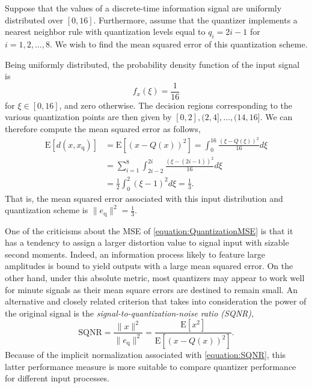 \begin{example} \label{example:UniformQuantizer}
Suppose that the values of a discrete-time information signal are uniformly distributed over $[0,16]$.
Furthermore, assume that the quantizer implements a nearest neighbor rule with quantization levels equal to $q_i = 2i - 1$ for $i = 1, 2, \ldots, 8$.
We wish to find the mean squared error of this quantization scheme.

Being uniformly distributed, the probability density function of the input signal is
\begin{equation*}
f_x (\xi) = \frac{1}{16}
\end{equation*}
for $\xi \in [0, 16]$, and zero otherwise.
The decision regions corresponding to the various quantization points are then given by $[0, 2], (2, 4], \ldots, (14, 16]$.
We can therefore compute the mean squared error as follows,
\begin{equation*}
\begin{split}
\mathrm{E} [ d(x, x_{\mathrm{q}}) ]
&= \mathrm{E} \left[ (x - Q(x))^2 \right]
= \int_0^{16} \frac{(\xi - Q(\xi))^2}{16} d\xi \\
&= \sum_{i=1}^8 \int_{2i-2}^{2i} \frac{(\xi - (2i - 1))^2}{16} d\xi \\
&= \frac{1}{2} \int_{0}^{2} (\xi - 1)^2 d\xi = \frac{1}{3} .
\end{split}
\end{equation*}
That is, the mean squared error associated with this input distribution and quantization scheme is $\| e_{\mathrm{q}} \|^2 = \frac{1}{3}$.
\end{example}

One of the criticisms about the MSE of \eqref{equation:QuantizationMSE} is that it has a tendency to assign a larger distortion value to signal input with sizable second moments.
Indeed, an information process likely to feature large amplitudes is bound to yield outputs with a large mean squared error.
On the other hand, under this absolute metric, most quantizers may appear to work well for minute signals as their mean square errors are destined to remain small.
An alternative and closely related criterion that takes into consideration the power of the original signal is the \emph{signal-to-quantization-noise ratio (SQNR)},
\begin{equation} \label{equation:SQNR}
\text{SQNR} = \frac{\| x \|^2}{\| e_{\mathrm{q}} \|^2}
= \frac{\mathrm{E} \left[ x^2 \right]}{\mathrm{E} \left[ (x - Q(x))^2 \right]} .
\end{equation}
Because of the implicit normalization associated with \eqref{equation:SQNR}, this latter performance measure is more suitable to compare quantizer performance for different input processes.

